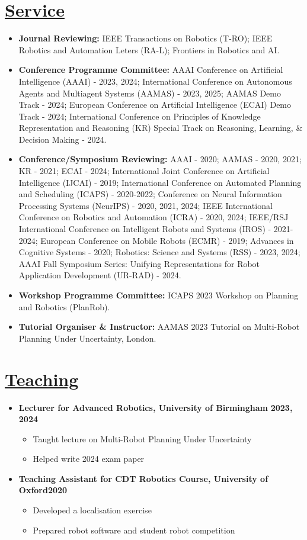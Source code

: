 \documentclass[11pt]{article}
\begin{document}
\section*{\underline{Service}}
\begin{itemize}
\item \textbf{Journal Reviewing:} IEEE Transactions on Robotics (T-RO); IEEE Robotics and Automation Leters (RA-L); Frontiers in Robotics and AI.
\item \textbf{Conference Programme Committee:}  AAAI Conference on Artificial Intelligence (AAAI) - 2023, 2024; International Conference on Autonomous Agents and Multiagent Systems (AAMAS) - 2023, 2025; AAMAS Demo Track - 2024; European Conference on Artificial Intelligence (ECAI) Demo Track - 2024; International Conference on Principles of Knowledge Representation and Reasoning (KR) Special Track on Reasoning, Learning, \& Decision Making - 2024.
\item \textbf{Conference/Symposium Reviewing:} AAAI - 2020; AAMAS - 2020, 2021; KR - 2021; ECAI - 2024; International Joint Conference on Artificial Intelligence (IJCAI) - 2019; International Conference on Automated Planning and Scheduling (ICAPS) - 2020-2022; Conference on Neural Information Processing Systems (NeurIPS) - 2020, 2021, 2024; IEEE International Conference on Robotics and Automation (ICRA) - 2020, 2024; IEEE/RSJ International Conference on Intelligent Robots and Systems (IROS) - 2021-2024; European Conference on Mobile Robots (ECMR) - 2019; Advances in Cognitive Systems - 2020;  Robotics: Science and Systems (RSS) - 2023, 2024; AAAI Fall Symposium Series: Unifying Representations for Robot Application Development (UR-RAD) - 2024.
\item\textbf{Workshop Programme Committee:} ICAPS 2023 Workshop on Planning and Robotics (PlanRob).
\item \textbf{Tutorial Organiser \& Instructor:} AAMAS 2023 Tutorial on Multi-Robot Planning Under Uncertainty, London.
\end{itemize}

\section*{\underline{Teaching}}
\begin{itemize}
\item \textbf{Lecturer for Advanced Robotics, University of Birmingham} \hfill  \textbf{2023,\,2024}
\begin{itemize}
\item Taught lecture on Multi-Robot Planning Under Uncertainty
\item Helped write 2024 exam paper
\end{itemize}
\item \textbf{Teaching Assistant for CDT Robotics Course, University of Oxford}\hfill \textbf{2020}
\begin{itemize}
\item Developed a localisation exercise
\item Prepared robot software and student robot competition
\end{itemize}
\end{itemize}
\end{document}
